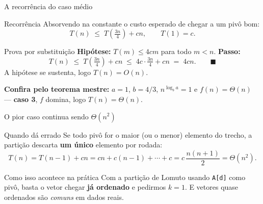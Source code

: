 \documentclass[aspectratio=169]{beamer}
\begin{document}
\begin{frame}{A recorrência do caso médio}
  \begin{block}{Recorrência}
    Absorvendo na constante o custo esperado de chegar a um pivô bom:
    \[ T(n) \;\le\; T\!\left(\tfrac{3n}{4}\right) + cn, \qquad T(1) = c. \]
  \end{block}

  \begin{block}{Prova por substituição}
    \textbf{Hipótese:} $T(m) \le 4cm$ para todo $m < n$. \quad \textbf{Passo:}
    \[
      T(n) \;\le\; T\!\left(\tfrac{3n}{4}\right) + cn
            \;\le\; 4c \cdot \tfrac{3n}{4} + cn
            \;=\; 4cn. \qquad \blacksquare
    \]
    A hipótese se sustenta, logo $T(n) = O(n)$.
  \end{block}

  \textbf{Confira pelo teorema mestre:} $a = 1$, $b = 4/3$, $n^{\log_b a} = 1$ e
  $f(n) = \Theta(n)$ --- \textbf{caso 3}, $f$ domina, logo $T(n) = \Theta(n)$.
\end{frame}

\begin{frame}{O pior caso continua sendo $\Theta(n^2)$}
  \begin{block}{Quando dá errado}
    Se todo pivô for o maior (ou o menor) elemento do trecho, a partição
    descarta \textbf{um único} elemento por rodada:
    \[
      T(n) = T(n-1) + cn = cn + c(n-1) + \cdots + c
           = c\,\frac{n(n+1)}{2} = \Theta(n^2).
    \]
  \end{block}

  \begin{center}
  \end{center}

  \begin{block}{Como isso acontece na prática}
    Com a partição de Lomuto usando \texttt{A[d]} como pivô, basta o vetor
    chegar \textbf{já ordenado} e pedirmos $k = 1$. E vetores quase ordenados
    são \emph{comuns} em dados reais.
  \end{block}
\end{frame}
\end{document}

